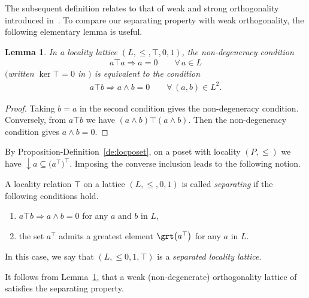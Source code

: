 \documentclass[pdftex]{sigma}
\numberwithin{equation}{section}
\newtheorem{Lemma}[Theorem]{Lemma}
\newcommand{\loc}{locality\xspace}
\newcommand{\pone}{separating\xspace }
\def \ptwob {separated\xspace }
\begin{document}
The subsequent definition relates to that of
	weak and strong orthogonality introduced in~\cite[Definition 2.2]{CM}. To compare our separating property with weak orthogonality, the following elementary lemma is useful.


\begin{Lemma}\label{lem:nondegseparating}
In a \loc lattice $(L, \leq, \top, 0, 1)$, the {\it non-degeneracy condition} \begin{gather*}%
a\top a\Longrightarrow a=0\qquad \forall\, a\in L
\end{gather*}
$($written $\ker \top =0$ in {\rm\cite{CM}}$)$ is equivalent to the condition
\begin{gather*}%
a\top b\Longrightarrow a\wedge b=0\qquad \forall\, (a, b)\in L^2.
\end{gather*}
\end{Lemma}

\begin{proof}
Taking $b=a$ in the second condition gives the non-degeneracy condition. Conversely, from $a\top b$ we have $(a\wedge b)\top (a\wedge b)$. Then the non-degeneracy condition gives $a\wedge b=0$.
\end{proof}

By Proposition-Definition~\ref{de:locposet}, on a poset with locality $(P, \leq)$ we have $\downarrow a\subseteq \big(a^\top\big)^\top $. Imposing the converse inclusion leads to the following notion.

\begin{Definition}\label{def:splitlattice}
	A \loc relation $\top$ on a lattice $(L, \leq, 0, 1) $
	is called {\it \pone} if the following conditions hold.
	\begin{enumerate}\itemsep=0pt
		\item[$(a)$] %
	 $a\top b\Rightarrow a\wedge b=0$ for any $a$ and $b$ in $L$,
		\item[$(b)$] the set $a^\top$ admits a greatest element $\grt\big(a^\top\big)$ for any $a$ in $L$.
	\end{enumerate}
In this case, we say that $(L, \leq 0, 1, \top) $ is a {\it \ptwob \loc lattice}.
\end{Definition}

\begin{Remark}
It follows from Lemma~\ref{lem:nondegseparating}, that a weak (non-degenerate) orthogonality lattice of~\cite[Definition 2.2]{CM} satisfies the separating property.
\end{Remark}
\end{document}
